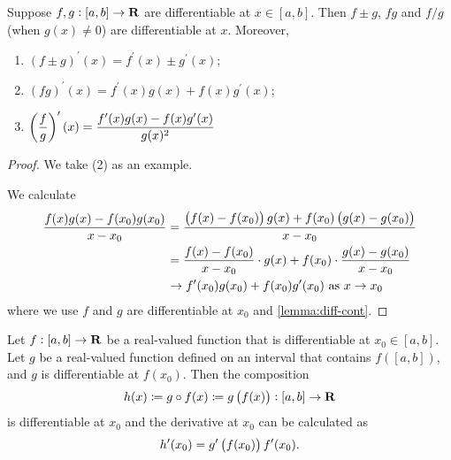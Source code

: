 \begin{lemma}
Suppose $f,g:[a,b]\to\mathbf R$ are differentiable at $x\in[a,b]$. Then $f\pm g$, $fg$ and $f/g$ (when $g(x)\neq0$) are differentiable at $x$. Moreover,
\begin{enumerate}[label=(\arabic*)]
\item $(f\pm g)^\prime(x)=f^\prime(x)\pm g^\prime(x)$;
\item $(fg)^\prime(x)=f^\prime(x)g(x)+f(x)g^\prime(x)$;
\item $\displaystyle\left(\frac{f}{g}\right)^\prime(x)=\frac{f^\prime(x)g(x)-f(x)g^\prime(x)}{g(x)^2}$
\end{enumerate}
\end{lemma}

\begin{proof}
We take (2) as an example.

We calculate
\begin{align*}
\frac{f(x)g(x)-f(x_0)g(x_0)}{x-x_0}&=\frac{\left(f(x)-f(x_0)\right)g(x)+f(x_0)\left(g(x)-g(x_0)\right)}{x-x_0}\\
&=\frac{f(x)-f(x_0)}{x-x_0}\cdot g(x)+f(x_0)\cdot\frac{g(x)-g(x_0)}{x-x_0}\\
&\to f^\prime(x_0)g(x_0)+f(x_0)g^\prime(x_0)\text{ as }x\to x_0
\end{align*}
where we use $f$ and $g$ are differentiable at $x_0$ and \cref{lemma:diff-cont}.
\end{proof}

\begin{theorem}
Let $f:[a,b]\to\mathbf R$ be a real-valued function that is differentiable at $x_0\in[a,b]$. Let $g$ be a real-valued function defined on an interval that contains $f([a,b])$, and $g$ is differentiable at $f(x_0)$. Then the composition
\[ h(x)\coloneqq g\circ f(x)\coloneqq g\left(f(x)\right):[a,b]\to\mathbf R \]
is differentiable at $x_0$ and the derivative at $x_0$ can be calculated as
\[ h^\prime(x_0)=g^\prime\left(f(x_0)\right)f^\prime(x_0). \]
\end{theorem}

